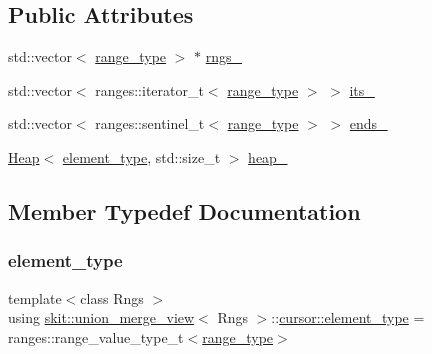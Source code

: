 \subsection*{Public Attributes}
\begin{DoxyCompactItemize}
\item 
std\+::vector$<$ \hyperlink{structskit_1_1union__merge__view_1_1cursor_aca3870894a5b4e031b79496118e9ca60}{range\+\_\+type} $>$ $\ast$ \hyperlink{structskit_1_1union__merge__view_1_1cursor_a6bbcfa016ea7479567838a2e3db2f8d9}{rngs\+\_\+}
\item 
std\+::vector$<$ ranges\+::iterator\+\_\+t$<$ \hyperlink{structskit_1_1union__merge__view_1_1cursor_aca3870894a5b4e031b79496118e9ca60}{range\+\_\+type} $>$ $>$ \hyperlink{structskit_1_1union__merge__view_1_1cursor_af4cdaba15091dfb47ab397ddb13eea45}{its\+\_\+}
\item 
std\+::vector$<$ ranges\+::sentinel\+\_\+t$<$ \hyperlink{structskit_1_1union__merge__view_1_1cursor_aca3870894a5b4e031b79496118e9ca60}{range\+\_\+type} $>$ $>$ \hyperlink{structskit_1_1union__merge__view_1_1cursor_ab3b57ed2eb5a5d2bfd7585222937ec20}{ends\+\_\+}
\item 
\hyperlink{classskit_1_1Heap}{Heap}$<$ \hyperlink{structskit_1_1union__merge__view_1_1cursor_acb2065245b1bc94caf985a6500636d27}{element\+\_\+type}, std\+::size\+\_\+t $>$ \hyperlink{structskit_1_1union__merge__view_1_1cursor_af93f22ffb1adb0fc7ca2f600f2b891a8}{heap\+\_\+}
\end{DoxyCompactItemize}


\subsection{Member Typedef Documentation}
\mbox{\label{structskit_1_1union__merge__view_1_1cursor_acb2065245b1bc94caf985a6500636d27}} 
\subsubsection{\texorpdfstring{element\+\_\+type}{element\_type}}
{\footnotesize\ttfamily template$<$class Rngs $>$ \\
using \hyperlink{classskit_1_1union__merge__view}{skit\+::union\+\_\+merge\+\_\+view}$<$ Rngs $>$\+::\hyperlink{structskit_1_1union__merge__view_1_1cursor_acb2065245b1bc94caf985a6500636d27}{cursor\+::element\+\_\+type} =  ranges\+::range\+\_\+value\+\_\+type\+\_\+t$<$\hyperlink{structskit_1_1union__merge__view_1_1cursor_aca3870894a5b4e031b79496118e9ca60}{range\+\_\+type}$>$}

